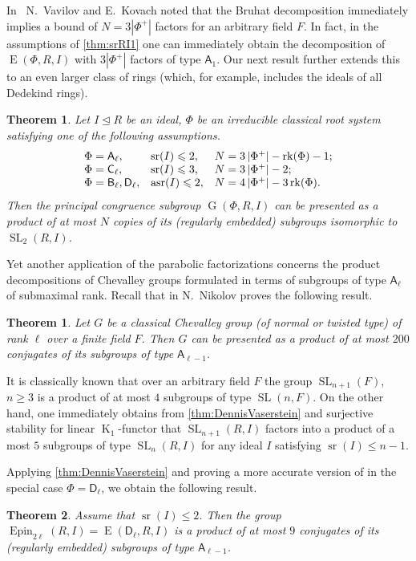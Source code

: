 \documentclass[oneside, 12pt]{amsart}
\theoremstyle{plain}
\newtheorem{thm}{Theorem}
\numberwithin{equation}{section}
\numberwithin{lemma}{section}
\newtheorem*{thm*}{Theorem}
\theoremstyle{definition}
\theoremstyle{remark}
\DeclareMathOperator{\K}{K}
\DeclareMathOperator{\G}{G}
\DeclareMathOperator{\SL}{SL}
\DeclareMathOperator{\E}{E}
\DeclareMathOperator{\sr}{sr}
\DeclareMathOperator{\asr}{asr}
\DeclareMathOperator{\Epin}{Epin}
\DeclareMathOperator{\rk}{rk}
\newcommand{\rA}{\mathsf{A}}
\newcommand{\rB}{\mathsf{B}}
\newcommand{\rC}{\mathsf{C}}
\newcommand{\rD}{\mathsf{D}}
\begin{document}
In~\cite{V13} N.~Vavilov and E.~Kovach noted that the Bruhat decomposition immediately implies a bound of $N=3|\Phi^+|$ factors for an arbitrary field $F$.
In fact, in the assumptions of \cref{thm:srRI1} one can immediately obtain the decomposition of $\E(\Phi, R, I)$ with $3|\Phi^+|$ factors of type $\rA_1$.
Our next result further extends this to an even larger class of rings (which, for example, includes the ideals of all Dedekind rings).
\begin{thm}\label{thm:SL2width}
Let $I\trianglelefteq R$ be an ideal, $\Phi$ be an irreducible classical root system satisfying one of the following assumptions.
\[\begin{array}{l@{\quad}l@{\quad}l}
\Phi=\rA_\ell, & \sr(I)\leqslant 2, & N=3\left|\Phi^+\right| - \rk(\Phi) - 1; \\
\Phi=\rC_\ell, & \sr(I)\leqslant 3, & N=3\left|\Phi^+\right| - 2; \\
\Phi=\rB_\ell, \rD_\ell, & \asr(I)\leqslant 2, & N=4\left|\Phi^+\right| - 3\rk(\Phi).
\end{array}\]
Then the principal congruence subgroup $\G(\Phi, R, I)$ can be presented as a product of at most $N$ copies of its (regularly embedded) subgroups isomorphic to $\SL_2(R, I)$.
\end{thm}

Yet another application of the parabolic factorizations concerns the product decompositions of Chevalley groups formulated in terms of subgroups of type $\rA_\ell$ of submaximal rank.
Recall that in \cite{Nik07} N.~Nikolov proves the following result. 
\begin{thm*} Let $G$ be a classical Chevalley group (of normal or twisted type) of rank $\ell$ over a finite field $F$.
Then $G$ can be presented as a product of at most $200$ conjugates of its subgroups of type $\rA_{\ell-1}$. \end{thm*}

It is classically known that over an arbitrary field $F$ the group $\SL_{n+1}(F)$, $n\geq 3$ is a product of at most $4$ subgroups of type $\SL(n, F)$.
On the other hand, one immediately obtains from \cref{thm:DennisVaserstein} and surjective stability for linear $\K_1$-functor that $\SL_{n+1}(R, I)$ factors into a product
of a most $5$ subgroups of type $\SL_n(R, I)$ for any ideal $I$ satisfying $\sr(I)\leqslant n-1$.

Applying \cref{thm:DennisVaserstein} and proving a more accurate version of \cite[Proposition~1]{Nik07} in the special case $\Phi=\rD_\ell$, we obtain the following result.
\begin{thm}\label{thm:spin-sln-prod}
Assume that $\sr(I) \leqslant 2$. Then the group $\Epin_{2\ell}(R, I)=\E(\rD_\ell, R, I)$ is a product of at most $9$ conjugates of its (regularly embedded) subgroups of type $\rA_{\ell-1}$.
\end{thm}
\end{document}
